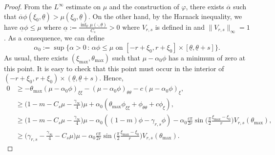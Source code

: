 \documentclass[11pt]{article}    %
\newcommand{\R}{\mathbb{R}}
\begin{document}
\begin{proof}
From the $L^\infty$ estimate on $\mu$ and the construction of $\varphi$, there exists $\overline\alpha$ such that $\overline\alpha \phi(\xi_0,\underline\theta) > \mu(\xi_0,\underline\theta)$. %
On the other hand, by the Harnack inequality, we have $\underline\alpha \phi \leq \mu$ where $\underline\alpha := \frac{ \inf_\R \mu(\cdot,\underline\theta)}{ C_s} > 0$ where $V_{r,s}$ is defined in  and $\|V_{r,s}\|_\infty = 1$. As a consequence, we can define 
\begin{equation*}
\alpha_0:= \sup \lbrace \alpha > 0 \, : \, \alpha \phi \leq \mu  \text{ on } [-r+\xi_0,r+\xi_0] \times [\underline\theta, \underline\theta + s] \rbrace.
\end{equation*}
As usual, %
there exists $(\xi_{\max} , \theta_{\max})$ such that $\mu - \alpha_0 \phi$ has a minimum of zero at this point.  It is easy to check that this point must occur in the interior of $(-r+\xi_0,r+\xi_0)\times(\underline\theta,\underline\theta+s)$.  Hence,%
\begin{equation}\label{eq:phi}
\begin{split}
0 & \geq  - \theta_{\max}( \mu - \alpha_0 \phi)_{\xi\xi} -    ( \mu - \alpha_0 \phi )_{\theta \theta} - c ( \mu - \alpha_0 \phi )_\xi, \\
& \geq  \big(1 - m - C_s \mu - \frac{\gamma_\infty}{4} \big)\mu + \alpha_0 ( \theta_{\max} \phi_{\xi\xi} + \phi_{\theta \theta} + c \phi_\xi ), \\
& \geq  \big(1 - m - C_s \mu - \frac{\gamma_\infty}{4} \big)\mu - \alpha_0 ( (1-m) \phi - \gamma_{r,s} \phi ) - \alpha_0 \frac{c\pi}{2r} \sin\Big( \frac{\pi}{2} \frac{\xi_{\max}-\xi_0}{r} \Big) V_{r,s}(\theta_{\max}),  \\
& \geq  \big( \gamma_{r,s} -\frac{\gamma_\infty}{4}- C_s \mu  \big) \mu - \alpha_0 \frac{c\pi}{2r} \sin\Big( \frac{\pi}{2} \frac{\xi_{\max} - \xi_0}{r}\Big) V_{r,s}(\theta_{\max}).

\end{split}
\end{equation}
\end{proof}
\end{document}

